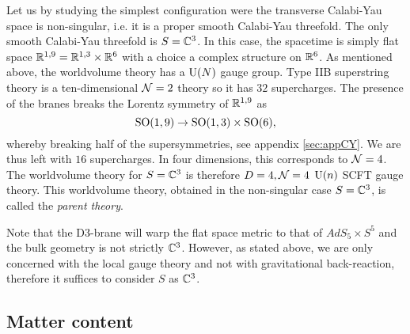\documentclass[a4paper,10pt]{article}
\begin{document}
        Let us by studying the simplest configuration were the transverse Calabi-Yau space is non-singular, i.e. it is a proper smooth Calabi-Yau threefold. The only smooth Calabi-Yau threefold is $S=\mathbb{C}^3$. In this case, the spacetime is simply flat space $\mathbb{R}^{1,9}=\mathbb{R}^{1,3}\times\mathbb{R}^6$ with a choice a complex structure on $\mathbb{R}^6$. As mentioned above, the worldvolume theory has a $\text{U}(N)$ gauge group. Type IIB superstring theory is a ten-dimensional $\mathcal{N}=2$ theory so it has $32$ supercharges. The presence of the branes breaks the Lorentz symmetry of $\mathbb{R}^{1,9}$ as
        \begin{equation}
            \text{SO}(1,9)\to\text{SO}(1,3)\times\text{SO}(6),
        \end{equation}
        whereby breaking half of the supersymmetries, see appendix \ref{sec:appCY}. We are thus left with $16$ supercharges. In four dimensions, this corresponds to $\mathcal{N}=4$. The worldvolume theory for $S=\mathbb{C}^3$ is therefore $D=4,\mathcal{N}=4$ $\text{U}(n)$ SCFT gauge theory. This worldvolume theory, obtained in the non-singular case $S=\mathbb{C}^3$, is called the \emph{parent theory}.

        Note that the D$3$-brane will warp the flat space metric to that of $AdS_5\times S^5$ and the bulk geometry is not strictly $\mathbb{C}^3$. However, as stated above, we are only concerned with the local gauge theory and not with gravitational back-reaction, therefore it suffices to consider $S$ as $\mathbb{C}^3$.

    \subsection{Matter content}
\end{document}
